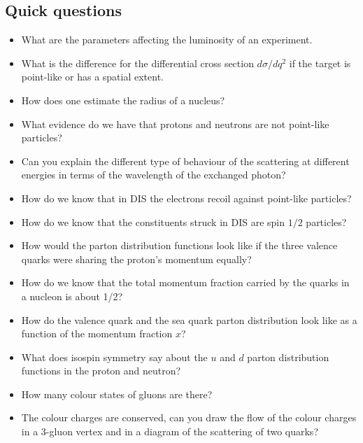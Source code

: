 \documentclass[12pt]{article}
\begin{document}
\subsection{Quick questions}
\begin{itemize}
\item What are the parameters affecting the luminosity of an experiment.
\item What is the difference for the differential cross section $d\sigma/dq^2$ if the target is point-like or has a spatial extent.
\item How does one estimate the radius of a nucleus?
\item What evidence do we have that protons and neutrons are not point-like particles? 
\item Can you explain the different type of behaviour of the scattering at different energies in  terms of the wavelength of the exchanged photon?
\item How do we know that in DIS the electrons recoil against point-like particles?
\item How do we know that the constituents struck in DIS are spin $1/2$ particles?
\item How would the parton distribution functions look like if the three valence quarks were sharing the proton's momentum equally?
\item How do we know that the total momentum fraction carried by the quarks in a nucleon is about 1/2?
\item How do the valence quark and the sea quark parton distribution look like as a function of the momentum fraction $x$?
\item What does isospin symmetry say about the $u$ and $d$ parton distribution functions in the proton and neutron?
\item How many colour states of gluons are there?
  \item The colour charges are conserved, can you draw the flow of the colour charges in a 3-gluon vertex and in a diagram of the scattering of two quarks?
\end{itemize}
%
%
%
%
%
%
%
%
\clearpage
\appendix
\end{document}
